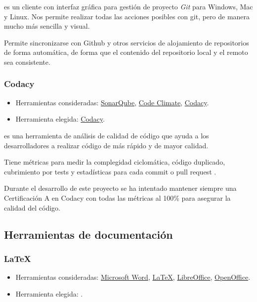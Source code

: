  es un cliente con interfaz gráfica para gestión de proyecto \textit{Git} para Windows, Mac y Linux. Nos permite realizar todas las acciones posibles con git, pero de manera mucho más sencilla y visual.

Permite sincronizarse con Github y otros servicios de alojamiento de repositorios de forma automática, de forma que el contenido del repositorio local y el remoto sea consistente.

\subsubsection{Codacy}

\begin{itemize}
	\tightlist
	\item
	Herramientas consideradas:
	\href{https://www.sonarqube.org/}{SonarQube}, 
	\href{https://codeclimate.com/}{Code Climate},
	\href{https://www.codacy.com/}{Codacy}.
	\item
	Herramienta elegida:
	\href{https://www.codacy.com/}{Codacy}.
\end{itemize}

 es una herramienta de análisis de calidad de código que ayuda a los desarrolladores a realizar código de más rápido y de mayor calidad.

Tiene métricas para medir la complegidad ciclomática, código duplicado, cubrimiento por tests y estadísticas para cada commit o pull request \cite{misc:codacygithub}.

Durante el desarrollo de este proyecto se ha intentado mantener siempre una Certificación A en Codacy con todas las métricas al 100\% para asegurar la calidad del código.


\subsection {Herramientas de documentación}

\subsubsection{LaTeX}

\begin{itemize}
	\tightlist
	\item
	Herramientas consideradas:
	\href{https://products.office.com/es-es/word}{Microsoft Word}, 
	\href{https://www.latex-project.org/}{LaTeX},
	\href{https://es.libreoffice.org/}{LibreOffice},
	\href{https://www.openoffice.org/es/}{OpenOffice}.
	\item
	Herramienta elegida:
	.
\end{itemize}

